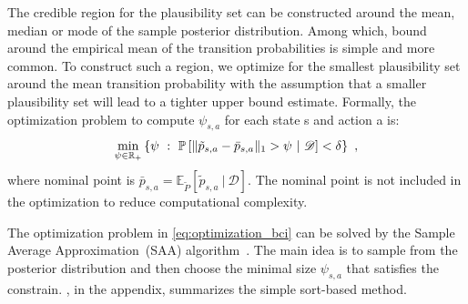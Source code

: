 \documentclass{article}
\DeclarePairedDelimiter{\norm}{\lVert}{\rVert}
\newcommand{\E}{\mathbb{E}}
\renewcommand{\P}{\mathbb{P}}
\newcommand{\Real}{\mathbb{R}}
\renewcommand{\ss}{~:~}
\theoremstyle{plain}
\theoremstyle{definition}
\begin{document}
The credible region for the plausibility set can be constructed around the mean, median or mode of the sample posterior distribution. Among which, bound around the empirical mean of the transition probabilities is simple and more common. To construct such a region, we optimize for the smallest plausibility set around the mean transition
probability with the assumption that a smaller plausibility set will lead to a tighter upper bound estimate.
Formally, the optimization problem to compute $\psi_{s,a}$ for each state s and action a is:
\begin{equation} \label{eq:optimization_bci}
\min_{\psi\in\Real_+} \left\{\psi \ss \P\left[ \norm{\tilde{p}_{s,a} - \bar{p}_{s,a}}_1 > \psi ~|~ \mathcal{D} \right] < \delta \right\}~,
\end{equation}
where nominal point is $\bar{p}_{s,a} = \E_{\tilde{P}}[\tilde{p}_{s,a} ~|~ \mathcal{D}]$. The nominal point is not included in the optimization to reduce computational complexity. 

The optimization problem in \cref{eq:optimization_bci} can be solved by the Sample Average Approximation~(SAA) algorithm~\citep{Shapiro2014}. The main idea is to sample from the posterior distribution and then choose the minimal size $\psi_{s,a}$ that satisfies the constrain.  , in the appendix, summarizes the simple sort-based method.
\end{document}
